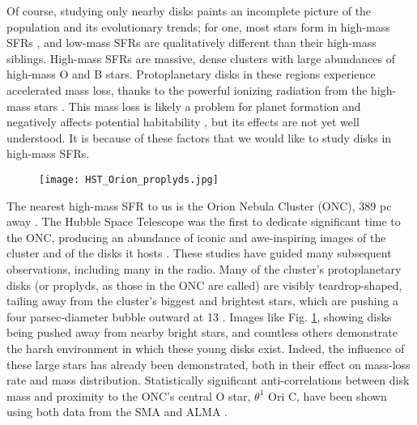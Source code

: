 Of course, studying only nearby disks paints an incomplete picture of the population and its evolutionary trends; for one, most stars form in high-mass SFRs \citep{LadaLada2003,Mann2015}, and low-mass SFRs are qualitatively different than their high-mass siblings. High-mass SFRs are massive, dense clusters with large abundances of high-mass O and B stars. Protoplanetary disks in these regions experience accelerated mass loss, thanks to the powerful ionizing radiation from the high-mass stars \citep{Anderson2013,Kalyaan2015,Xiao2018}. This mass loss is likely a problem for planet formation \citep{Johnstone1998,Ovelar2012} and negatively affects potential habitability \citep{Kruijssen2019}, but its effects are not yet well understood. It is because of these factors that we would like to study disks in high-mass SFRs.


\begin{figure}[t!]
\centering
  \texttt{[image: HST\_Orion\_proplyds.jpg]}
  \label{fig:HST_ONC}
\end{figure}



The nearest high-mass SFR to us is the Orion Nebula Cluster (ONC), 389 pc away \citep{GaiaCollaboration2018}. The Hubble Space Telescope was the first to dedicate significant time to the ONC, producing an abundance of iconic and awe-inspiring images of the cluster and of the disks it hosts \citep{Ricci2008}. These studies have guided many subsequent observations, including many in the radio. Many of the cluster's protoplanetary disks (or proplyds, as those in the ONC are called) are visibly teardrop-shaped, tailing away from the cluster's biggest and brightest stars, which are pushing a four parsec-diameter bubble outward at 13 \kms{} \citep{Pabst2019}. Images like Fig. \ref{fig:HST_ONC}, showing disks being pushed away from nearby bright stars, and countless others demonstrate the harsh environment in which these young disks exist. Indeed, the influence of these large stars has already been demonstrated, both in their effect on mass-loss rate and mass distribution. Statistically significant anti-correlations between disk mass and proximity to the ONC's central O star, $\theta^1$ Ori C, have been shown using both data from the SMA \citep{MannWilliams2009} and ALMA \citep{Mann2014,Ansdell2017,Eisner2018}.


